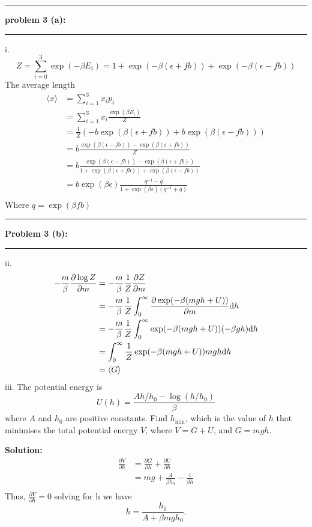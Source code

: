 \documentclass[11pt]{article}
\newcommand\question[2]{\vspace{.25in}\hrule\textbf{#1: #2}\vspace{.5em}\hrule\vspace{.10in}}
\begin{document}
\question{problem 3 (a)}{}
i. 
\[Z = \sum_{i=0}^{3}\exp(-\beta E_i) = 1 + \exp(-\beta(\epsilon + fb)) + \exp(-\beta(\epsilon - fb))\]
The average length
\begin{align*}
    \langle x\rangle &= \sum_{i=1}^{3} x_i p_i\\
                     &= \sum_{i=1}^{3} x_i \frac{\exp(\beta E_i)}{Z}\\
                     &= \frac{1}{Z}(-b\exp(\beta(\epsilon + fb)) + b\exp(\beta(\epsilon - fb)))\\
                     &= b\frac{\exp(\beta(\epsilon - fb)) - \exp(\beta(\epsilon + fb))}{Z}\\
                     &= b\frac{\exp(\beta(\epsilon - fb)) - \exp(\beta(\epsilon + fb))}{1 + \exp(\beta(\epsilon + fb)) + \exp(\beta(\epsilon - fb))}\\
                     &= b\exp(\beta\epsilon)\frac{q^{-1} - q}{1+\exp(\beta\epsilon)(q^{-1}+q)}\\
\end{align*}
Where $q = \exp(\beta fb)$

\question{Problem 3 (b)}{}
ii. 
\begin{align*}
    -\frac{m}{\beta}\frac{\partial \log Z}{\partial m} 
        &= -\frac{m}{\beta}\frac{1}{Z}\frac{\partial Z}{\partial m}\\
        &= -\frac{m}{\beta}\frac{1}{Z}\int_{0}^{\infty} \frac{\partial \exp(-\beta(mgh+U))}{\partial m}\mathrm{d} h\\
        &= -\frac{m}{\beta}\frac{1}{Z}\int_{0}^{\infty} \exp(-\beta(mgh+U))(-\beta gh)\mathrm{d} h\\
        &= \int_{0}^{\infty} \frac{1}{Z}\exp(-\beta(mgh+U))mgh\mathrm{d} h\\
        &= \langle G \rangle 
\end{align*}
iii.
The potential energy is 
\[U(h) = \frac{Ah/h_0 - \log(h/h_0)}{\beta}\]
where $A$ and $h_0$ are positive constants. Find $h_\mathrm{min}$, which is the value of $h$ that minimises the total potential energy $V$,
where $V = G + U$, and $G = mgh$.

\textbf{Solution:}
\begin{align*}
    \frac{\partial V}{\partial h} &= \frac{\partial G}{\partial h} + \frac{\partial U}{\partial h}\\
                                  &= mg + \frac{A}{\beta h_0} - \frac{1}{\beta h}\\
\end{align*}
Thus, $\frac{\partial V}{\partial h} = 0$ solving for h we have \[h = \frac{h_0}{A + \beta mgh_0}.\]
\end{document}
